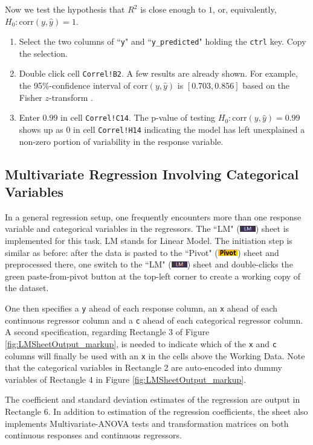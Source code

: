 \documentclass[article]{jss}
\numberwithin{equation}{subsection}
\newcommand{\shtPivot}{``Pivot" (\includegraphics[height=8pt, keepaspectratio=true]{img/PivotSheetTab_png}) }
\newcommand{\shtLM}{``LM" (\includegraphics[height=8pt, keepaspectratio=true]{img/LMSheetTab_png}) }
\begin{document}
        Now we test the hypothesis that $R^2$ is close enough to $1$, or, equivalently, $H_0: \textrm{corr} (y, \hat y) = 1$.
        \begin{enumerate}
          \item Select the two columns of ``\texttt{y}" and ``\texttt{y\_predicted}" holding the \texttt{ctrl} key. Copy the selection.
          \item Double click cell \texttt{Correl!B2}. 
          A few results are already shown. For example, the 95\%-confidence interval of $\textrm{corr} (y, \hat y)$ is $[0.703,0.856]$ based on the Fisher $z$-transform \citep{Fisherztransform1915}.
          \item Enter $0.99$ in  cell \texttt{Correl!C14}. The p-value of testing $H_0: \textrm{corr} (y, \hat y) = 0.99$ shows up as 0 in cell \texttt{Correl!H14} indicating the model has left unexplained a non-zero portion of variability in the response variable.
        \end{enumerate}
        
        \subsection[egLM]{Multivariate Regression Involving Categorical Variables}
        In a general regression setup, one frequently encounters more than one response variable and categorical variables in the regressors. The \shtLM sheet is implemented for this task. LM stands for Linear Model. The initiation step is similar as before: after the data is pasted to the \shtPivot sheet and preprocessed there, one switch to the \shtLM sheet and double-clicks the green paste-from-pivot button at the top-left corner to create a working copy of the dataset. 
        
        One then specifies a \texttt{y} ahead of each response column, an \texttt{x} ahead of each continuous regressor column and a \texttt{c} ahead of each categorical regressor column.        
        A second specification, regarding Rectangle 3 of Figure \ref{fig:LMSheetOutput_markup}, is needed to indicate which of the \texttt{x} and \texttt{c} columns will finally be used with an \texttt{x} in the cells above the Working Data. Note that the categorical variables in Rectangle 2 are auto-encoded into dummy variables of Rectangle 4 in Figure \ref{fig:LMSheetOutput_markup}. 
        
        The coefficient and standard deviation estimates of the regression are output in Rectangle 6. In addition to estimation of the regression coefficients, the sheet also implements Multivariate-ANOVA tests and transformation matrices on both continuous responses and continuous regressors.
        
\end{document}
